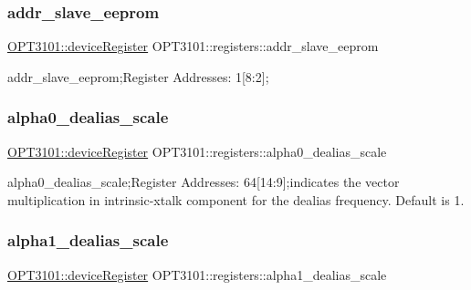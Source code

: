 \subsubsection{\texorpdfstring{addr\+\_\+slave\+\_\+eeprom}{addr\_slave\_eeprom}}
{\footnotesize\ttfamily \mbox{\hyperlink{class_o_p_t3101_1_1device_register}{O\+P\+T3101\+::device\+Register}} O\+P\+T3101\+::registers\+::addr\+\_\+slave\+\_\+eeprom}



addr\+\_\+slave\+\_\+eeprom;Register Addresses\+: 1\mbox{[}8\+:2\mbox{]}; 

\mbox{\label{class_o_p_t3101_1_1registers_a29ac388846dfe0bbbdcee909aeb94b04}} 
\subsubsection{\texorpdfstring{alpha0\+\_\+dealias\+\_\+scale}{alpha0\_dealias\_scale}}
{\footnotesize\ttfamily \mbox{\hyperlink{class_o_p_t3101_1_1device_register}{O\+P\+T3101\+::device\+Register}} O\+P\+T3101\+::registers\+::alpha0\+\_\+dealias\+\_\+scale}



alpha0\+\_\+dealias\+\_\+scale;Register Addresses\+: 64\mbox{[}14\+:9\mbox{]};indicates the vector multiplication in intrinsic-\/xtalk component for the dealias frequency. Default is \textquotesingle{}1\textquotesingle{}. 

\mbox{\label{class_o_p_t3101_1_1registers_a712fda429e950ee47aa365e4b7dfd1a8}} 
\subsubsection{\texorpdfstring{alpha1\+\_\+dealias\+\_\+scale}{alpha1\_dealias\_scale}}
{\footnotesize\ttfamily \mbox{\hyperlink{class_o_p_t3101_1_1device_register}{O\+P\+T3101\+::device\+Register}} O\+P\+T3101\+::registers\+::alpha1\+\_\+dealias\+\_\+scale}



